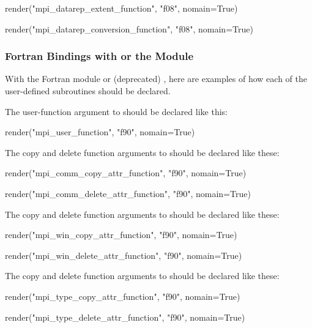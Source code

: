 \begin{mpi-binding}
    render("mpi_datarep_extent_function", "f08", nomain=True)
\end{mpi-binding}
\begin{mpi-binding}
    render("mpi_datarep_conversion_function", "f08", nomain=True)
\end{mpi-binding}

\subsubsection{Fortran Bindings with \texorpdfstring{}{mpif.h}
 or the \texorpdfstring{}{mpi} Module}

With
the Fortran  module or (deprecated) , here are examples of how each of the user-defined
subroutines should be declared.

The user-function argument to  should be declared
like this:

\begin{mpi-binding}
    render("mpi_user_function", "f90", nomain=True)
\end{mpi-binding}

The copy and delete function arguments to  should be
declared like these:

\begin{mpi-binding}
    render("mpi_comm_copy_attr_function", "f90", nomain=True)
\end{mpi-binding}
\begin{mpi-binding}
    render("mpi_comm_delete_attr_function", "f90", nomain=True)
\end{mpi-binding}

The copy and delete function arguments to  should be
declared like these:

\begin{mpi-binding}
    render("mpi_win_copy_attr_function", "f90", nomain=True)
\end{mpi-binding}
\begin{mpi-binding}
    render("mpi_win_delete_attr_function", "f90", nomain=True)
\end{mpi-binding}

The copy and delete function arguments to  should be
declared like these:

\begin{mpi-binding}
    render("mpi_type_copy_attr_function", "f90", nomain=True)
\end{mpi-binding}
\begin{mpi-binding}
    render("mpi_type_delete_attr_function", "f90", nomain=True)
\end{mpi-binding}


